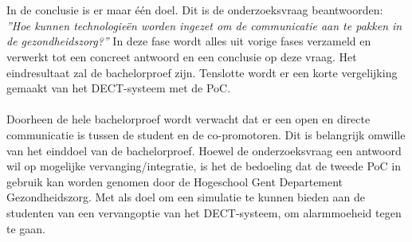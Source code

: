 \section{}
\label{sec:conclusion}
In de conclusie is er maar één doel. Dit is de onderzoeksvraag beantwoorden: \textit{''Hoe kunnen technologieën worden ingezet om de communicatie aan te pakken in de gezondheidszorg?''} In deze fase wordt alles uit vorige fases verzameld en verwerkt tot een concreet antwoord en een conclusie op deze vraag. Het eindresultaat zal de bachelorproef zijn. Tenslotte wordt er een korte vergelijking gemaakt van het DECT-systeem met de PoC.
\\\\
Doorheen de hele bachelorproef wordt verwacht dat er een open en directe communicatie is tussen de student en de co-promotoren. Dit is belangrijk omwille van het einddoel van de bachelorproef. Hoewel de onderzoeksvraag een antwoord wil op mogelijke vervanging/integratie, is het de bedoeling dat de tweede PoC in gebruik kan worden genomen door de Hogeschool Gent Departement Gezondheidszorg. Met als doel om een simulatie te kunnen bieden aan de studenten van een vervangoptie van het DECT-systeem, om alarmmoeheid tegen te gaan.

